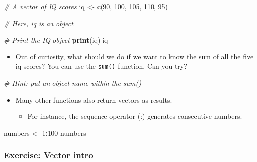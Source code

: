 \documentclass[
]{book}
\newenvironment{Shaded}{\begin{snugshade}}{\end{snugshade}}
\newcommand{\CommentTok}[1]{\textcolor[rgb]{0.56,0.35,0.01}{\textit{#1}}}
\newcommand{\DecValTok}[1]{\textcolor[rgb]{0.00,0.00,0.81}{#1}}
\newcommand{\FunctionTok}[1]{\textcolor[rgb]{0.13,0.29,0.53}{\textbf{#1}}}
\newcommand{\NormalTok}[1]{#1}
\newcommand{\OtherTok}[1]{\textcolor[rgb]{0.56,0.35,0.01}{#1}}
\newcommand{\SpecialCharTok}[1]{\textcolor[rgb]{0.81,0.36,0.00}{\textbf{#1}}}
\providecommand{\tightlist}{%
  \setlength{\itemsep}{0pt}\setlength{\parskip}{0pt}}
\begin{document}
\begin{Shaded}
\begin{Highlighting}[]
\CommentTok{\# A vector of IQ scores}
\NormalTok{iq }\OtherTok{\textless{}{-}} \FunctionTok{c}\NormalTok{(}\DecValTok{90}\NormalTok{, }\DecValTok{100}\NormalTok{, }\DecValTok{105}\NormalTok{, }\DecValTok{110}\NormalTok{, }\DecValTok{95}\NormalTok{)}

\CommentTok{\# Here, \textquotesingle{}iq\textquotesingle{} is an object}

\CommentTok{\# Print the IQ object}
\FunctionTok{print}\NormalTok{(iq)}
\NormalTok{iq}
\end{Highlighting}
\end{Shaded}

\begin{itemize}
\tightlist
\item
  Out of curiosity, what should we do if we want to know the sum of all the five iq scores? You can use the \texttt{sum()} function. Can you try?
\end{itemize}

\begin{Shaded}
\begin{Highlighting}[]
\CommentTok{\# Hint: put an object name within the sum()}
\end{Highlighting}
\end{Shaded}

\begin{itemize}
\tightlist
\item
  Many other functions also return vectors as results.

  \begin{itemize}
  \tightlist
  \item
    For instance, the sequence operator (:) generates consecutive numbers.
  \end{itemize}
\end{itemize}

\begin{Shaded}
\begin{Highlighting}[]
\NormalTok{numbers }\OtherTok{\textless{}{-}} \DecValTok{1}\SpecialCharTok{:}\DecValTok{100}
\NormalTok{numbers}
\end{Highlighting}
\end{Shaded}

\subsubsection{Exercise: Vector intro}\label{exercise-vector-intro}
\end{document}
